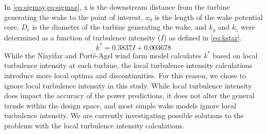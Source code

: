 \documentclass[a4paper]{jpconf}
\begin{document}
%
In \cref{eq:sigmay,eq:sigmaz}, x is the downstream distance from the turbine generating the wake to the point of interest, $x_0$ is the length of the wake potential core, $D_r$ is the diameter of the turbine generating the wake, and $k_y$ and $k_z$ were determined as a function of turbulence intensity ($I$) as defined in \cref{eq:kstar}\cite{niayifar2016}.
%
\begin{equation}\label{eq:kstar}
	k^* = 0.3837I + 0.003678
\end{equation}
%
While the Niayifar and Port\'e-Agel wind farm model calculates $k^*$ based on local turbulence intensity at each turbine, the local turbulence intensity calculations introduce more local optima and discontinuities. For this reason, we chose to ignore local turbulence intensity in this study. While local turbulence intensity does impact the accuracy of the power predictions, it does not alter the general trends within the design space, and most simple wake models ignore local turbulence intensity. We are currently investigating possible solutions to the problems with the local turbulence intensity calculations.
%
%
\end{document}
